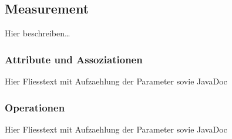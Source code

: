 \subsection{Measurement}

Hier beschreiben\ldots


\subsubsection{Attribute und Assoziationen}

Hier Fliesstext mit Aufzaehlung der Parameter sovie JavaDoc


\subsubsection{Operationen}


Hier Fliesstext mit Aufzaehlung der Parameter sovie JavaDoc